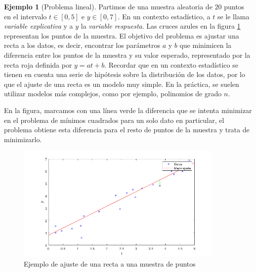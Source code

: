 \documentclass[11pt,a4paper]{book}
\theoremstyle{definition}
\newtheorem{ejemplo}[theorem]{Ejemplo}
\theoremstyle{remark}
\begin{document}
\begin{ejemplo}[Problema lineal]
Partimos de una muestra
	aleatoria de $20$ puntos en el intervalo $t\in [0,5]$ e $y\in [0,7]$. En un contexto estadístico, a $t$ se le llama \textit{variable explicativa} y a $y$ la \textit{variable respuesta}. Las cruces azules en la figura \ref{fig:lsqlin} representan los puntos de la muestra. El objetivo del problema es ajustar una recta a los datos, es decir, encontrar los parámetros $a$ y $b$ que minimicen la diferencia entre los puntos de la muestra y su valor esperado, representado por la recta roja definida por $y=at+b$. Recordar que en un contexto estadístico se tienen en cuenta una serie de hipótesis sobre la distribución de los datos, por lo que el ajuste de una recta es un modelo muy simple. En la práctica, se suelen utilizar modelos más complejos, como por ejemplo, polinomios de grado $n$.

	En la figura, marcamos con una línea verde la diferencia que se intenta minimizar en el problema de mínimos cuadrados para un solo dato en particular, el problema obtiene esta diferencia para el resto de puntos de la muestra y trata de minimizarlo.
\end{ejemplo}
\newpage
\begin{figure}[h]
	\centering
	\includegraphics[width=0.9\textwidth]{imgs/examplelsqlin.png}
	\caption{Ejemplo de ajuste de una recta a una muestra de puntos}
	\label{fig:lsqlin}
\end{figure}


\end{document}

